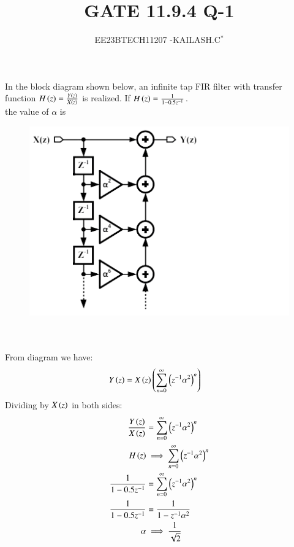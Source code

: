 \documentclass[journal,12pt,twocolumn]{IEEEtran}
\theoremstyle{remark}
\begin{document}

\vspace{3cm}

\title{GATE 11.9.4 Q-1}
\author{EE23BTECH11207 -KAILASH.C$^{*}$%
}
\maketitle
\newpage
\bigskip

\renewcommand{\thefigure}{\theenumi}
\renewcommand{\thetable}{\theenumi}
In the block diagram shown below, an infinite tap FIR filter with transfer function $H\left(z\right)=\frac{Y\left(z\right)}{X\left(z\right)}$ is realized. If $H\left(z\right)=\frac{1}{1-0.5z^{-1}}$.\\the value of $\alpha$ is
\begin{figure}[h]
    \includegraphics[width=1\columnwidth]{questionfig.png}
    \label{fig:question31bm}
\end{figure}\\
\solution
\\
From diagram we have:
\begin{align}
    Y\left(z\right)&=X\left(z\right)\left(\sum_{n=0}^{\infty}\left(z^{-1}\alpha^{2}\right)^n\right)\label{eq:311_bm}
\end{align}
Dividing by $X\left(z\right)$ in both sides:
\begin{align}
    \frac{Y\left(z\right)}{X\left(z\right)}&=\sum_{n=0}^{\infty}\left(z^{-1}\alpha^{2}\right)^n\label{eq:312_bm}\\
    H\left(z\right)&\implies\sum_{n=0}^{\infty}\left(z^{-1}\alpha^{2}\right)^n\label{eq:313_bm}\\
    \frac{1}{1-0.5z^{-1}}&=\sum_{n=0}^{\infty}\left(z^{-1}\alpha^{2}\right)^n\label{eq:314_bm}\\
\frac{1}{1-0.5z^{-1}}&=\frac{1}{1-z^{-1}\alpha^{2}}\label{eq:315_bm}\\
\alpha&\implies\frac{1}{\sqrt{2}}\label{eq:316_bm}
\end{align}
\end{document}
